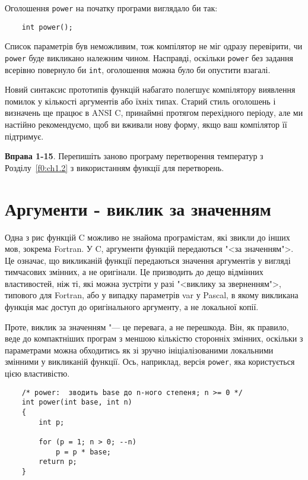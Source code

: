 \documentclass[a4paper,12pt]{book}
\begin{document}
  Оголошення \texttt{power} на початку програми виглядало би так:
  \begin{verbatim}
    int power();
  \end{verbatim}

  Список параметрів був неможливим, тож компілятор не міг одразу перевірити, чи
  \texttt{power} буде викликано належним чином. Насправді, оскільки \texttt{power} без
  задання всерівно повернуло би \texttt{int}, оголошення можна було би опустити взагалі.

  Новий синтаксис прототипів функцій набагато полегшує компілятору виявлення помилок у
  кількості аргументів або їхніх типах. Старий стиль оголошень і визначень ще працює в
  ANSI C, принаймні протягом перехідного періоду, але ми настійно рекомендуємо, щоб ви
  вживали нову форму, якщо ваш компілятор її підтримує.

  \textbf{Вправа 1-15}. Перепишіть заново програму перетворення температур з 
  Розділу~\ref{f0:ch1.2} з використанням функції для перетворень.

\section{Аргументи - виклик за значенням}


  Одна з рис функцій C можливо не знайома програмістам, які звикли до інших мов, зокрема
  Fortran. У C, аргументи функцій передаються "<за значенням">. Це означає, що
  викликаній функції передаються значення аргументів у вигляді тимчасових змінних, а не
  оригінали. Це призводить до дещо відмінних властивостей, ніж ті, які можна зустріти у
  разі "<виклику за зверненням">, типового для Fortran, або у випадку параметрів
  var у Pascal, в якому викликана функція має доступ до оригінального аргументу, а не
  локальної копії.

  Проте, виклик за значенням "--- це перевага, а не перешкода. Він, як правило, веде до
  компактніших програм з меншою кількістю сторонніх змінних, оскільки з параметрами можна
  обходитись як зі зручно ініціалізованими локальними змінними у викликаній функції. Ось,
  наприклад, версія \texttt{power}, яка користується цією властивістю.

  \begin{verbatim}
    /* power:  зводить base до n-ного степеня; n >= 0 */
    int power(int base, int n)
    {
        int p;

        for (p = 1; n > 0; --n)
            p = p * base;
        return p;
    }
  \end{verbatim}
\end{document}

